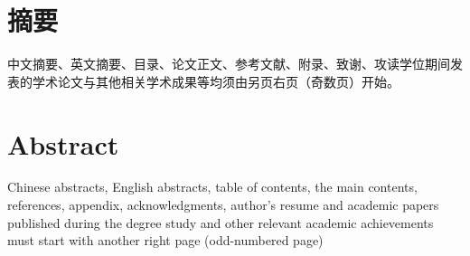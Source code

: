 \maketitle%
\MAKETITLE%
\makedeclaration%
\intobmk\chapter*{摘\quad 要}%
\setcounter{page}{1}%

中文摘要、英文摘要、目录、论文正文、参考文献、附录、致谢、攻读学位期间发表的学术论文与其他相关学术成果等均须由另页右页（奇数页）开始。
 
 

\intobmk\chapter*{Abstract}%

 Chinese abstracts, English abstracts, table of contents, the main contents, references, appendix, acknowledgments, author's resume and academic papers published during the degree study and other relevant academic achievements must start with another right page (odd-numbered page)

